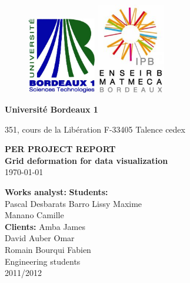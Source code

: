 \begin{titlepage}
  \begin {figure}[ht]
	\includegraphics[angle=0,width=3cm]{img/logobordeaux1.jpg}
        \hspace{11cm}
	\includegraphics[angle=0,width=3cm]{img/logo.jpg}
	\label{logo}
  \end {figure}
  \begin{flushleft}
    \textbf{Université Bordeaux 1}

    351, cours de la Libération 
    F-33405 Talence cedex 
    
  \end{flushleft}
  
  \vspace{4cm}
	\begin{center}
	  {\bf PER PROJECT REPORT}\\
	  \vspace{1cm}
		 {\LARGE\bf Grid deformation for data visualization}\\
\vspace{4cm}
           {\today}

	\end{center}


        \vspace{4cm}
        \begin{flushleft}
	  \begin{tabbing}
		\textbf{Works analyst:}
		\hspace{8.5cm} \=\textbf{Students:} \\
                \noindent Pascal {\sc Desbarats}
		\> {\sc Barro} Lissy Maxime\\
                \> {\sc Manano} Camille\\
                \noindent \textbf{Clients:}
		 Amba James\\
                \noindent David {\sc Auber}
                 Omar\\
                \noindent Romain {\sc Bourqui}
                 Fabien\\[0.3 cm]
                \>Engineering students \\
                 2011/2012\\
	  \end{tabbing}
        \end{flushleft}


\end{titlepage}

